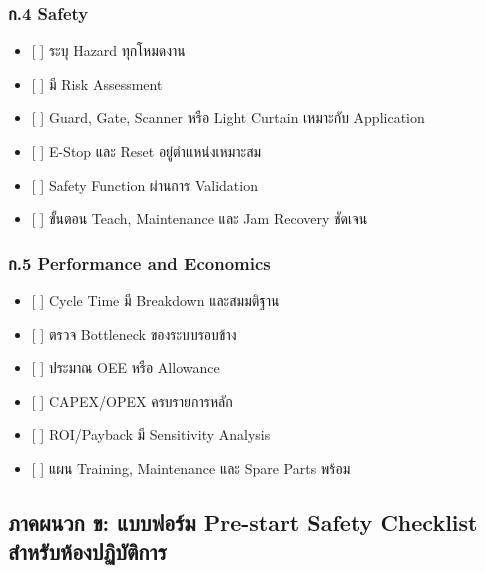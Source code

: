 \subsubsection{ก.4 Safety}

\begin{itemize}
    \item {[ ]} ระบุ Hazard ทุกโหมดงาน
    \item {[ ]} มี Risk Assessment
    \item {[ ]} Guard, Gate, Scanner หรือ Light Curtain เหมาะกับ Application
    \item {[ ]} E-Stop และ Reset อยู่ตำแหน่งเหมาะสม
    \item {[ ]} Safety Function ผ่านการ Validation
    \item {[ ]} ขั้นตอน Teach, Maintenance และ Jam Recovery ชัดเจน
\end{itemize}

\subsubsection{ก.5 Performance and Economics}

\begin{itemize}
    \item {[ ]} Cycle Time มี Breakdown และสมมติฐาน
    \item {[ ]} ตรวจ Bottleneck ของระบบรอบข้าง
    \item {[ ]} ประมาณ OEE หรือ Allowance
    \item {[ ]} CAPEX/OPEX ครบรายการหลัก
    \item {[ ]} ROI/Payback มี Sensitivity Analysis
    \item {[ ]} แผน Training, Maintenance และ Spare Parts พร้อม
\end{itemize}



\subsection{ภาคผนวก ข: แบบฟอร์ม Pre-start Safety Checklist สำหรับห้องปฏิบัติการ}

